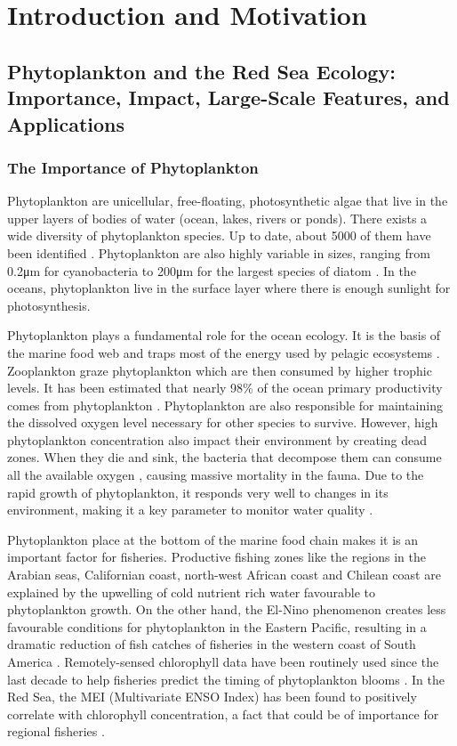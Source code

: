 \chapter{Introduction and Motivation}

\section{Phytoplankton and the Red Sea Ecology: Importance, Impact, Large-Scale
Features, and Applications}

\subsection{The Importance of Phytoplankton}

Phytoplankton are unicellular, free-floating, photosynthetic algae that live in the upper layers of bodies of water (ocean, lakes, rivers or ponds). There exists a wide diversity of phytoplankton species. Up to date, about 5000 of them have been identified \cite{Tett1995}. Phytoplankton are also highly variable in sizes, ranging from 0.2μm for cyanobacteria to 200μm for the largest species of diatom \cite{Pal2014}. In the oceans, phytoplankton live in the surface layer where there is enough sunlight for photosynthesis. 

Phytoplankton plays a fundamental role for the ocean ecology. It is the basis of the marine food web and traps most of the energy used by pelagic ecosystems \cite{Pal2014}. Zooplankton graze phytoplankton which are then consumed by higher trophic levels. It has been estimated that nearly 98\% of the ocean primary productivity comes from phytoplankton \cite{Pal2014}. Phytoplankton are also responsible for maintaining the dissolved oxygen level necessary for other species to survive. However, high phytoplankton concentration also impact their environment by creating dead zones. When they die and sink, the bacteria that decompose them can consume all the available oxygen \cite{Pal2014}, causing massive mortality in the fauna. Due to the rapid growth of phytoplankton, it responds very well to changes in its environment, making it a key parameter to monitor water quality \cite{Wu2014}.

Phytoplankton place at the bottom of the marine food chain makes it is an important factor for fisheries. Productive fishing zones like the regions in the Arabian seas, Californian coast, north-west African coast and Chilean coast are explained by the upwelling of cold nutrient rich water favourable to phytoplankton growth. On the other hand, the El-Nino phenomenon creates less favourable conditions for phytoplankton in the Eastern Pacific, resulting in a dramatic reduction of fish catches of fisheries in the western coast of South America \cite{Robinson2010}. Remotely-sensed chlorophyll data have been routinely used since the last decade to help fisheries predict the timing of phytoplankton blooms \cite{Robinson2010}. In the Red Sea, the MEI (Multivariate ENSO Index) has been found to positively correlate with chlorophyll concentration, a fact that could be of importance for regional fisheries \cite{Raitsos2015}.

